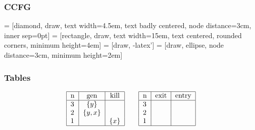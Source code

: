 \documentclass[letterpaper,twocolumn,10pt]{article}
\begin{document}
\subsubsection{CCFG}
 = [diamond, draw, 
    text width=4.5em, text badly centered, node distance=3cm, inner sep=0pt]
 = [rectangle, draw, 
    text width=15em, text centered, rounded corners, minimum height=4em]
 = [draw, -latex']
 = [draw, ellipse, node distance=3cm,
    minimum height=2em]
\begin{center}
\end{center}

\subsubsection{Tables}
\begin{align*}
\begin{tabular}{|l|*{2}{c|}}
  \hline
  n & gen & kill  \\
  \hline 
  3 & $\{y \}$ & \\ 
  2 & $\{y, x\}$ & \\
  1 &  & $\{x\}$ \\
  \hline
\end{tabular}
\qquad
\begin{tabular}{|l|*{2}{c|}}
  \hline
  n & exit & entry  \\
  \hline 
  3 &  & \\ 
  2 &  &\\
  1 &  & \\
  \hline
\end{tabular}
\end{align*}
\end{document}
